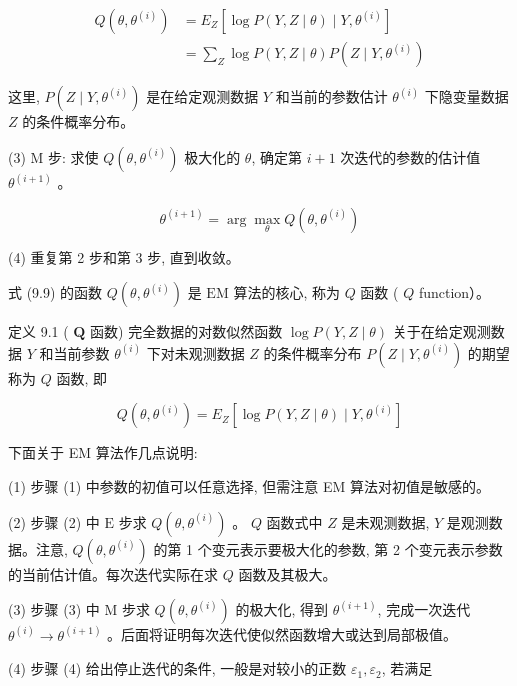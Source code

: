 \documentclass[10pt]{article}
\begin{document}
\begin{align*}
Q\left(\theta, \theta^{(i)}\right) & =E_{Z}\left[\log P(Y, Z \mid \theta) \mid Y, \theta^{(i)}\right] \\
& =\sum_{Z} \log P(Y, Z \mid \theta) P\left(Z \mid Y, \theta^{(i)}\right) \tag{9.9}
\end{align*}


这里, $P\left(Z \mid Y, \theta^{(i)}\right)$ 是在给定观测数据 $Y$ 和当前的参数估计 $\theta^{(i)}$ 下隐变量数据 $Z$ 的条件概率分布。

(3) $\mathrm{M}$ 步: 求使 $Q\left(\theta, \theta^{(i)}\right)$ 极大化的 $\theta$, 确定第 $i+1$ 次迭代的参数的估计值 $\theta^{(i+1)}$ 。


\begin{equation*}
\theta^{(i+1)}=\arg \max _{\theta} Q\left(\theta, \theta^{(i)}\right) \tag{9.10}
\end{equation*}


(4) 重复第 2 步和第 3 步, 直到收敛。

式 (9.9) 的函数 $Q\left(\theta, \theta^{(i)}\right)$ 是 $\mathrm{EM}$ 算法的核心, 称为 $Q$ 函数 ( $Q$ function）。

定义 9.1 ( $\boldsymbol{Q}$ 函数) 完全数据的对数似然函数 $\log P(Y, Z \mid \theta)$ 关于在给定观测数据 $Y$ 和当前参数 $\theta^{(i)}$ 下对未观测数据 $Z$ 的条件概率分布 $P\left(Z \mid Y, \theta^{(i)}\right)$ 的期望称为 $Q$ 函数, 即


\begin{equation*}
Q\left(\theta, \theta^{(i)}\right)=E_{Z}\left[\log P(Y, Z \mid \theta) \mid Y, \theta^{(i)}\right] \tag{9.11}
\end{equation*}


下面关于 EM 算法作几点说明:

(1) 步骤 (1) 中参数的初值可以任意选择, 但需注意 EM 算法对初值是敏感的。

(2) 步骤 (2) 中 $\mathrm{E}$ 步求 $Q\left(\theta, \theta^{(i)}\right)$ 。 $Q$ 函数式中 $Z$ 是未观测数据, $Y$ 是观测数据。注意, $Q\left(\theta, \theta^{(i)}\right)$ 的第 1 个变元表示要极大化的参数, 第 2 个变元表示参数的当前估计值。每次迭代实际在求 $Q$ 函数及其极大。

(3) 步骤 (3) 中 $\mathrm{M}$ 步求 $Q\left(\theta, \theta^{(i)}\right)$ 的极大化, 得到 $\theta^{(i+1)}$, 完成一次迭代 $\theta^{(i)} \rightarrow \theta^{(i+1)}$ 。后面将证明每次迭代使似然函数增大或达到局部极值。

(4) 步骤 (4) 给出停止迭代的条件, 一般是对较小的正数 $\varepsilon_{1}, \varepsilon_{2}$, 若满足
\end{document}
